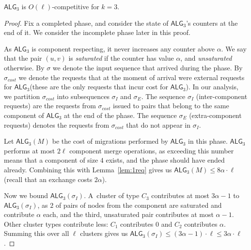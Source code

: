 \documentclass[manuscript,screen=true, review, anonymous]{acmart}
\newcommand{\TAlg}{{\ensuremath{\textsf{ALG}_{3}}}\xspace}
\begin{document}
\begin{theorem}
	\TAlg is $O(\ell)$-competitive for $k=3$.
\end{theorem}
\begin{proof}
	Fix a completed phase, and consider the state of \TAlg's counters at the end of it.
	We consider the incomplete phase later in this proof.
	
	As \TAlg is component respecting, it never increases any counter above $\alpha$.
	We say that the pair $(u, v)$ is \emph{saturated} if the counter has value $\alpha$, and \emph{unsaturated} otherwise.
	By $\sigma$ we denote the input sequence that arrived during the phase.
	By $\sigma_{cost}$ we denote the requests that at the moment of arrival were external requests for \TAlg (these are the only requests that incur cost for \TAlg).
	In our analysis, we partition $\sigma_{cost}$ into subsequences $\sigma_I$ and $\sigma_E$.
	The sequence $\sigma_I$ (inter-component requests) are the requests from $\sigma_{cost}$ issued to pairs that belong to the same component of \TAlg at the end of the phase.
	The sequence $\sigma_E$ (extra-component requests) denotes the requests from $\sigma_{cost}$ that do not appear in $\sigma_I$.
	
	
	Let $\TAlg(M)$ be the cost of migrations performed by \TAlg in this phase.
	\TAlg performs at most $2 \ell$ component merge operations, as
	exceeding this number means that a component of size $4$ exists, and the phase should have ended already.
	Combining this with Lemma~\ref{lem:1req} gives us $\TAlg(M) \leq 8\alpha\cdot\ell$ (recall that an exchange costs $2\alpha$).
	
	Now we bound $\TAlg(\sigma_I)$.
	A~cluster of type $C_3$ contributes at most $3 \alpha - 1$ to $\TAlg(\sigma_I)$, as $2$ of pairs of nodes from the component are saturated and contribute $\alpha$ each, and the third, unsaturated pair contributes at most $\alpha-1$.
	Other cluster types contribute less: $C_1$ contributes $0$ and $C_2$ contributes $\alpha$.
	Summing this over all $\ell$ clusters gives us $\TAlg(\sigma_I) \leq (3 \alpha-1)\cdot \ell \leq 3\alpha\cdot\ell$.
	

\end{proof}
\end{document}
